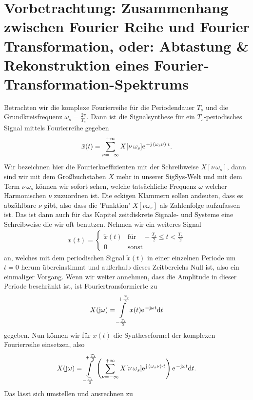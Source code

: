 \section*{Vorbetrachtung: Zusammenhang zwischen Fourier Reihe und Fourier
Transformation,
oder:
Abtastung \& Rekonstruktion eines Fourier-Transformation-Spektrums}
%
Betrachten wir die komplexe Fourierreihe für die Periodendauer
$T_s$ und die Grundkreisfrequenz $\omega_s=\frac{2\pi}{T_s}$.
Dann ist die Signalsynthese für ein $T_s$-periodisches Signal mittels Fourierreihe
gegeben
\begin{align}
  \tilde{x}(t) = \sum_{\nu=-\infty}^{+\infty} X[\nu\,\omega_s]
  \e^{+\im\,(\omega_s \nu)\cdot t}.
\end{align}
Wir bezeichnen hier die Fourierkoeffizienten mit der Schreibweise
$X[\nu\,\omega_s]$,
dann sind wir mit dem Großbuchstaben $X$ mehr in unserer SigSys-Welt und mit
dem Term $\nu\,\omega_s$ können wir sofort sehen,
welche tatsächliche Frequenz $\omega$ welcher Harmonischen $\nu$ zuzuordnen ist.
Die eckigen Klammern sollen andeuten, dass
es abzählbare $\nu$ gibt, also dass die 'Funktion' $X[\nu\omega_s]$
als Zahlenfolge aufzufassen ist. Das ist dann auch für das Kapitel zeitdiskrete
Signale- und Systeme eine Schreibweise die wir oft benutzen.
%
Nehmen wir ein weiteres Signal
\begin{align}
  x(t) =
  \begin{cases}
  \tilde{x}(t)&\text{für}\quad-\frac{T_s}{2} \leq t < \frac{T_s}{2}\\
  0&\text{sonst}
  \end{cases}
\end{align}
an, welches mit dem periodischen Signal $\tilde{x}(t)$
in einer einzelnen Periode um $t=0$ herum übereinstimmt
und außerhalb dieses Zeitbereichs Null ist, also ein einmaliger Vorgang.
Wenn wir weiter annehmen, dass die Amplitude in dieser Periode beschränkt ist,
ist Fouriertransformierte zu
\begin{align}
  X(\im\omega) = \int\limits_{-\frac{T_s}{2}}^{+\frac{T_s}{2}} x(t) \e^{-\im\omega t} \fsd t
\end{align}
gegeben.
Nun können wir für $x(t)$ die Syntheseformel der komplexen Fourierreihe einsetzen,
also
\begin{align}
X(\im\omega) = \int\limits_{-\frac{T_s}{2}}^{+\frac{T_s}{2}}
\left(\sum_{\nu=-\infty}^{+\infty} X[\nu\,\omega_s] \e^{\im\,(\omega_s \nu)\cdot t}\right)
\e^{-\im\omega t} \fsd t.
\end{align}
Das lässt sich umstellen und ausrechnen zu
